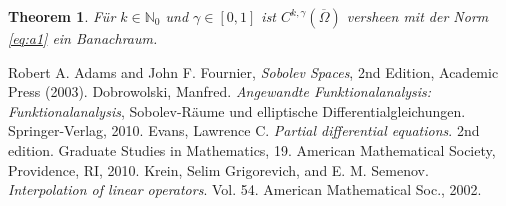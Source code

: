 \documentclass[
paper=a4,
bibtotocnumbered,
liststotocnumbered,
tablecaptionabove,
pointlessnumbers,
twoside,
openright,
10pt
]
{report}
\newtheorem{thm}{Theorem}[chapter]
\theoremstyle{definition}
\numberwithin{equation}{chapter}
\begin{document}
\begin{thm}
Für $k\in \mathbb N_0$ und $\gamma \in [0,1]$ ist $C^{k,\gamma}(\overline{\Omega})$ versheen mit der Norm \eqref{eq:a1} ein Banachraum.
\end{thm}
\begin{thebibliography}{xxx}
 Robert A. Adams and John F.  Fournier, \textit{Sobolev Spaces}, 2nd Edition, Academic Press (2003).
 Dobrowolski, Manfred. \textit{Angewandte Funktionalanalysis: Funktionalanalysis}, Sobolev-Räume und elliptische Differentialgleichungen. Springer-Verlag, 2010.
 Evans, Lawrence C.
\textit{Partial differential equations}. 
2nd edition. Graduate Studies in Mathematics, 19. American Mathematical Society, Providence, RI, 2010.
 Krein, Selim Grigorevich, and E. M. Semenov. \textit{Interpolation of linear operators}. Vol. 54. American Mathematical Soc., 2002.
\end{thebibliography}
\end{document}

